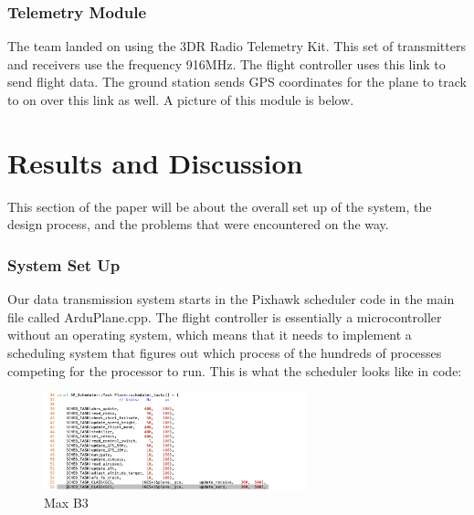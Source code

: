 \documentclass[12pt,journal,compsoc]{IEEEtran}
\begin{document}
\subsubsection{Telemetry Module}
The team landed on using the 3DR Radio Telemetry Kit. This set of transmitters and receivers use the frequency 916MHz. The flight controller uses this link to send flight data. The ground station sends GPS coordinates for the plane to track to on over this link as well. A picture of this module is below.

\section{Results and Discussion}
This section of the paper will be about the overall set up of the system, the design process, and the problems that were encountered on the way.
\subsubsection{System Set Up}
Our data transmission system starts in the Pixhawk scheduler code in the main file called ArduPlane.cpp. The flight controller is essentially a microcontroller without an operating system, which means that it needs to implement a scheduling system that figures out which process of the hundreds of processes competing for the processor to run. This is what the scheduler looks like in code:
\begin{figure}[h!]
\hspace*{0cm}
\centering
\includegraphics[width=3in]{Scheduler.png}
\caption{Max B3}
\label{mavSched}
\end{figure}
\end{document}
